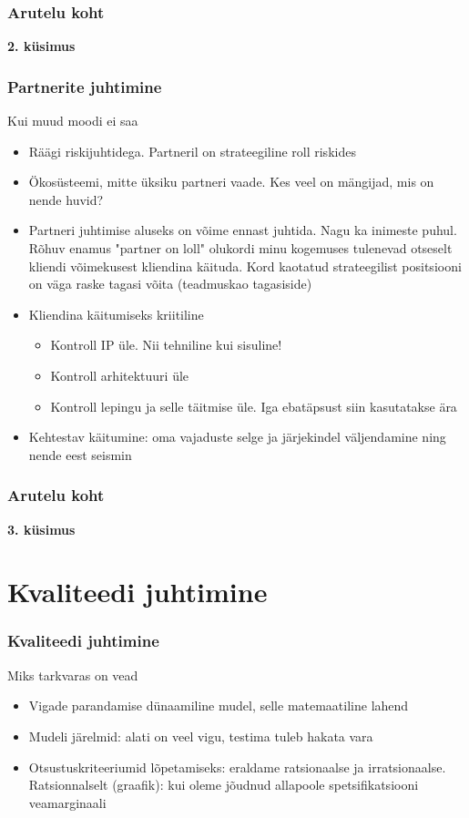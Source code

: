 \begin{frame}[fragile]
  \frametitle{Arutelu koht}
		\begin{center}
			\textbf{2. küsimus}
		\end{center}
\end{frame}

\begin{frame}[fragile]
  \frametitle{Partnerite juhtimine}
  Kui muud moodi ei saa
	\begin{itemize}
		\item Räägi riskijuhtidega. Partneril on strateegiline roll riskides
		\item Ökosüsteemi, mitte üksiku partneri vaade. Kes veel on mängijad, mis on nende huvid?
		\item Partneri juhtimise aluseks on võime ennast juhtida. Nagu ka inimeste puhul. Rõhuv enamus "partner on loll" olukordi minu kogemuses tulenevad otseselt kliendi võimekusest kliendina käituda. Kord kaotatud strateegilist positsiooni on väga raske tagasi võita (teadmuskao tagasiside)
		\item Kliendina käitumiseks kriitiline
			\begin{itemize}
				\item Kontroll IP üle. Nii tehniline kui sisuline!
				\item Kontroll arhitektuuri üle
				\item Kontroll lepingu ja selle täitmise üle. Iga ebatäpsust siin kasutatakse ära
			\end{itemize}		
		\item Kehtestav käitumine: oma vajaduste selge ja järjekindel väljendamine ning nende eest seismin
	\end{itemize}
\end{frame}

\begin{frame}[fragile]
  \frametitle{Arutelu koht}
		\begin{center}
			\textbf{3. küsimus}
		\end{center}
\end{frame}

\section{Kvaliteedi juhtimine}

\begin{frame}[fragile]
  \frametitle{Kvaliteedi juhtimine}
	Miks tarkvaras on vead
	\begin{itemize}
		\item Vigade parandamise dünaamiline mudel, selle matemaatiline lahend
		\item Mudeli järelmid: alati on veel vigu, testima tuleb hakata vara
		\item Otsustuskriteeriumid lõpetamiseks: eraldame ratsionaalse ja irratsionaalse. Ratsionnalselt (graafik): kui oleme jõudnud allapoole spetsifikatsiooni veamarginaali
	\end{itemize}
\end{frame}

